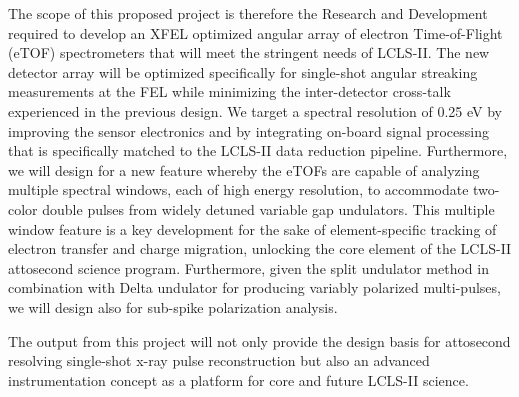 The scope of this proposed project is therefore the Research and Development required to develop an XFEL optimized angular array of electron Time-of-Flight (eTOF) spectrometers that will meet the stringent needs of LCLS-II. 
The new detector array will be optimized specifically for single-shot angular streaking measurements at the FEL while minimizing the inter-detector cross-talk experienced in the previous design.
We target a spectral resolution of 0.25 eV by improving the sensor electronics and by integrating on-board signal processing that is specifically matched to the LCLS-II data reduction pipeline. 
Furthermore, we will design for a new feature whereby the eTOFs are capable of analyzing multiple spectral windows, each of high energy resolution, to accommodate two-color double pulses from widely detuned variable gap undulators. 
This multiple window feature is a key development for the sake of element-specific tracking of electron transfer and charge migration, unlocking the core element of the LCLS-II attosecond science program. 
Furthermore, given the split undulator method in combination with Delta undulator for producing variably polarized multi-pulses, we will design also for sub-spike polarization analysis.

The output from this project will not only provide the design basis for attosecond resolving single-shot x-ray pulse reconstruction but also an advanced instrumentation concept as a platform for core and future LCLS-II science.





